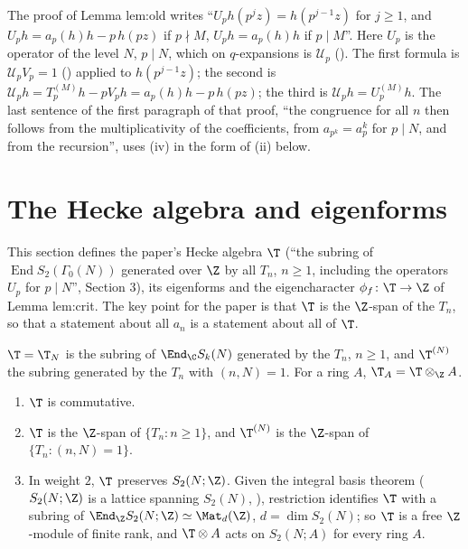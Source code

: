 \begin{paperlink}\label{pl:hecke:lem-old-formulas}
The proof of Lemma lem:old writes ``$U_ph(p^jz)=h(p^{j-1}z)$ for $j\ge1$, and $U_ph=a_p(h)h-p\,h(pz)$ if $p\nmid M$, $U_ph=a_p(h)h$ if $p\mid M$''. Here $U_p$ is the operator of the
level $N$, $p\mid N$, which on $q$-expansions is $\mathcal U_p$ (). The first formula is $\mathcal U_pV_p=1$ () applied to $h(p^{j-1}z)$; the
second is $\mathcal U_ph=T_p^{(M)}h-pV_ph=a_p(h)h-p\,h(pz)$; the third is $\mathcal U_ph=U_p^{(M)}h$. The last sentence of the first paragraph of that proof, ``the congruence for all
$n$ then follows from the multiplicativity of the coefficients, from $a_{p^k}=a_p^k$ for $p\mid N$, and from the recursion'', uses (iv) in the form of
(ii) below.
\end{paperlink}

\section{The Hecke algebra and eigenforms}\label{sec:hecke:algebra}

This section defines the paper's Hecke algebra $\T$ (``the subring of $\operatorname{End}S_2(\Gamma_0(N))$ generated over $\Z$ by all $T_n$, $n\ge1$, including the operators $U_p$
for $p\mid N$'', Section 3), its eigenforms and the eigencharacter $\phi_f\colon\T\to\Z$ of Lemma lem:crit. The key point for the paper is that $\T$ is the $\Z$-span of the
$T_n$, so that a statement about all $a_n$ is a statement about all of $\T$.

\begin{definition}\label{def:hecke:hecke-algebra}
$\T=\T_N$ is the subring of $\End_\C S_k(N)$ generated by the $T_n$, $n\ge1$, and $\T^{(N)}$ the subring generated by the $T_n$ with $(n,N)=1$. For a ring $A$, $\T_A=\T\otimes_\Z A$.
\end{definition}

\begin{proposition}\label{prop:hecke:hecke-algebra}
\begin{enumerate}[label=(\roman*)]
\item $\T$ is commutative.
\item $\T$ is the $\Z$-span of $\{T_n:n\ge1\}$, and $\T^{(N)}$ is the $\Z$-span of $\{T_n:(n,N)=1\}$.
\item In weight $2$, $\T$ preserves $S_2(N;\Z)$. Given the integral basis theorem ($S_2(N;\Z)$ is a lattice spanning $S_2(N)$, ), restriction identifies $\T$
with a subring of $\End_\Z S_2(N;\Z)\simeq\Mat_d(\Z)$, $d=\dim S_2(N)$; so $\T$ is a free $\Z$-module of finite rank, and $\T\otimes A$ acts on $S_2(N;A)$ for every ring $A$.
\end{enumerate}
\end{proposition}

